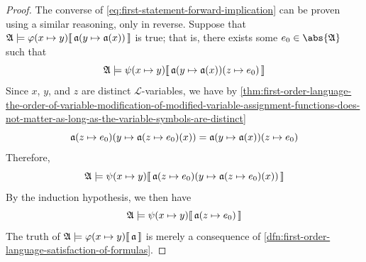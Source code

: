 \begin{proof}
    The converse of \eqref{eq:first-statement-forward-implication} can be proven using a similar reasoning, only in reverse.
    Suppose that \( \folwffsatisfaction{\mathfrak{A}}{ \folfreevariablereplacement{\varphi}{x}{y} }{ \folmodifiedvariableassignmentfunction{\mathfrak{a}}{y}{\mathfrak{a}(x)} } \)
    is true; that is, there exists some \( e_{0} \in \abs{\mathfrak{A}} \) such that
    \begin{equation*}
        \folwffsatisfaction{\mathfrak{A}}{ \folfreevariablereplacement{\psi}{x}{y} }{ \folmodifiedvariableassignmentfunction{ \folmodifiedvariableassignmentfunction{\mathfrak{a}}{y}{\mathfrak{a}(x)} }{z}{e_{0}} }
    \end{equation*}
    Since \( x \), \( y \), and \( z \) are distinct \( \mathcal{L} \)-variables, we have by \cref{thm:first-order-language-the-order-of-variable-modification-of-modified-variable-assignment-functions-does-not-matter-as-long-as-the-variable-symbols-are-distinct}
    \begin{equation*}
        \folmodifiedvariableassignmentfunction{ \folmodifiedvariableassignmentfunction{\mathfrak{a}}{z}{e_{0}} }{y}{ \folmodifiedvariableassignmentfunction{\mathfrak{a}}{z}{e_{0}}(x) } = \folmodifiedvariableassignmentfunction{ \folmodifiedvariableassignmentfunction{\mathfrak{a}}{y}{\mathfrak{a}(x)} }{z}{e_{0}}
    \end{equation*}
    Therefore,
    \begin{equation*}
        \folwffsatisfaction{\mathfrak{A}}{ \folfreevariablereplacement{\psi}{x}{y} }{ \folmodifiedvariableassignmentfunction{ \folmodifiedvariableassignmentfunction{\mathfrak{a}}{z}{e_{0}} }{y}{ \folmodifiedvariableassignmentfunction{\mathfrak{a}}{z}{e_{0}}(x) } }
    \end{equation*}
    By the induction hypothesis, we then have
    \begin{equation*}
        \folwffsatisfaction{\mathfrak{A}}{ \folfreevariablereplacement{\psi}{x}{y} }{ \folmodifiedvariableassignmentfunction{\mathfrak{a}}{z}{e_{0}} }
    \end{equation*}
    The truth of \( \folwffsatisfaction{\mathfrak{A}}{ \folfreevariablereplacement{\varphi}{x}{y} }{\mathfrak{a}} \) is merely a consequence of
    \cref{dfn:first-order-language-satisfaction-of-formulas}.


\end{proof}
